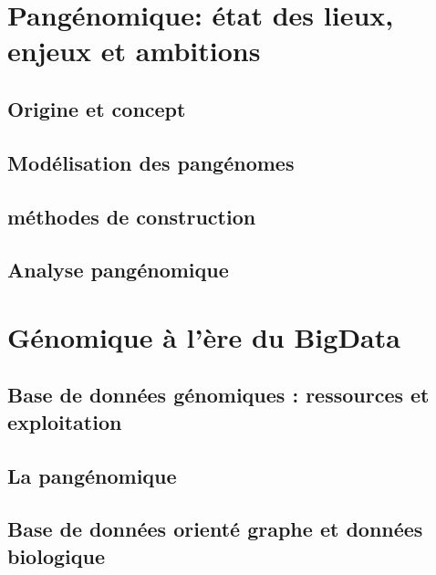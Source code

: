 


\chapter{Pangénomique: état des lieux, enjeux et ambitions}
\section{Origine et concept}
\section{Modélisation des pangénomes}
\section{méthodes de construction}
\section{Analyse pangénomique}
\chapter{Génomique à l'ère du BigData}
\section{Base de données génomiques : ressources et exploitation}
\section{La pangénomique}
\section{Base de données orienté graphe et données biologique}